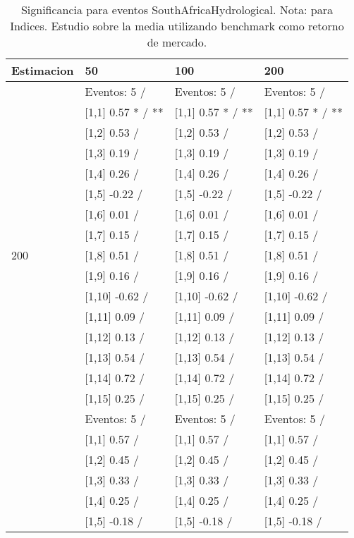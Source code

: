 \begin{table}

\caption{Significancia para eventos SouthAfricaHydrological. Nota: para Indices. Estudio sobre la media utilizando benchmark como retorno de mercado.}
\centering
\begin{tabular}[t]{llll}
\toprule
Estimacion & 50 & 100 & 200\\
\midrule
 & Eventos:  5 / & Eventos:  5 / & Eventos:  5 /\\
 & {}[1,1] 0.57 * / ** & {}[1,1] 0.57 * / ** & {}[1,1] 0.57 * / **\\
 & {}[1,2] 0.53  / & {}[1,2] 0.53  / & {}[1,2] 0.53  /\\
 & {}[1,3] 0.19  / & {}[1,3] 0.19  / & {}[1,3] 0.19  /\\
 & {}[1,4] 0.26  / & {}[1,4] 0.26  / & {}[1,4] 0.26  /\\
\addlinespace
 & {}[1,5] -0.22  / & {}[1,5] -0.22  / & {}[1,5] -0.22  /\\
 & {}[1,6] 0.01  / & {}[1,6] 0.01  / & {}[1,6] 0.01  /\\
 & {}[1,7] 0.15  / & {}[1,7] 0.15  / & {}[1,7] 0.15  /\\
200 & {}[1,8] 0.51  / & {}[1,8] 0.51  / & {}[1,8] 0.51  /\\
 & {}[1,9] 0.16  / & {}[1,9] 0.16  / & {}[1,9] 0.16  /\\
\addlinespace
 & {}[1,10] -0.62  / & {}[1,10] -0.62  / & {}[1,10] -0.62  /\\
 & {}[1,11] 0.09  / & {}[1,11] 0.09  / & {}[1,11] 0.09  /\\
 & {}[1,12] 0.13  / & {}[1,12] 0.13  / & {}[1,12] 0.13  /\\
 & {}[1,13] 0.54  / & {}[1,13] 0.54  / & {}[1,13] 0.54  /\\
 & {}[1,14] 0.72  / & {}[1,14] 0.72  / & {}[1,14] 0.72  /\\
\addlinespace
 & {}[1,15] 0.25  / & {}[1,15] 0.25  / & {}[1,15] 0.25  /\\
 & Eventos:  5 / & Eventos:  5 / & Eventos:  5 /\\
 & {}[1,1] 0.57  / & {}[1,1] 0.57  / & {}[1,1] 0.57  /\\
 & {}[1,2] 0.45  / & {}[1,2] 0.45  / & {}[1,2] 0.45  /\\
 & {}[1,3] 0.33  / & {}[1,3] 0.33  / & {}[1,3] 0.33  /\\
\addlinespace
 & {}[1,4] 0.25  / & {}[1,4] 0.25  / & {}[1,4] 0.25  /\\
 & {}[1,5] -0.18  / & {}[1,5] -0.18  / & {}[1,5] -0.18  /\\

\end{tabular}
\end{table}
